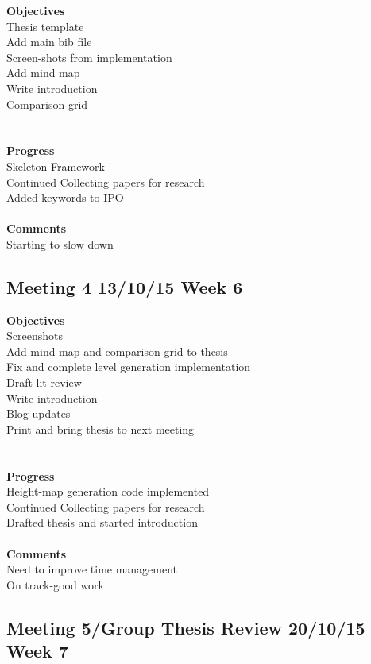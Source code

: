 \textbf{Objectives}\\
Thesis template\\
Add main bib file\\
Screen-shots from implementation\\
Add mind map\\
Write introduction\\
Comparison grid\\
\\\\\textbf{Progress}\\
Skeleton Framework\\
Continued Collecting papers for research\\
Added keywords to IPO\\\\\textbf{Comments}\\
Starting to slow down


\subsection{Meeting 4 13/10/15 Week 6}

\textbf{Objectives}\\
Screenshots\\
Add mind map and comparison grid to thesis\\
Fix and complete level generation implementation\\
Draft lit review\\
Write introduction\\
Blog updates\\
Print and bring thesis to next meeting \\
\\\\\textbf{Progress}\\
Height-map generation code implemented\\
Continued Collecting papers for research\\
Drafted thesis and started introduction\\\\\textbf{Comments}\\
Need to improve time management\\
On track-good work

\subsection{Meeting 5/Group Thesis Review 20/10/15 Week 7}

